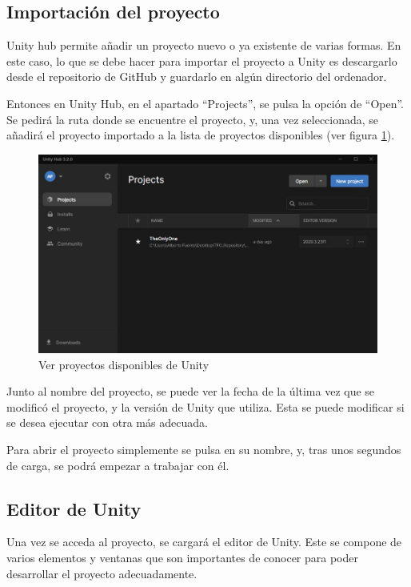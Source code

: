 \subsection{Importación del proyecto}
Unity hub permite añadir un proyecto nuevo o ya existente de varias formas. En este caso, lo que se debe hacer para importar el proyecto a Unity es descargarlo desde el repositorio de GitHub y guardarlo en algún directorio del ordenador.

Entonces en Unity Hub, en el apartado ``Projects'', se pulsa la opción de ``Open''. Se pedirá la ruta donde se encuentre el proyecto, y, una vez seleccionada, se añadirá el proyecto importado a la lista de proyectos disponibles (ver figura \ref{fig:ProyectosUnity}).

\begin{figure}[h]
    \centering
    \includegraphics[scale=0.45]{img/UnityProjects.jpg}
    \caption{Ver proyectos disponibles de Unity}
    \label{fig:ProyectosUnity}
    \end{figure}
    
Junto al nombre del proyecto, se puede ver la fecha de la última vez que se modificó el proyecto, y la versión de Unity que utiliza. Esta se puede modificar si se desea ejecutar con otra más adecuada.

Para abrir el proyecto simplemente se pulsa en su nombre, y, tras unos segundos de carga, se podrá empezar a trabajar con él.

\subsection{Editor de Unity}
Una vez se acceda al proyecto, se cargará el editor de Unity. Este se compone de varios elementos y ventanas que son importantes de conocer para poder desarrollar el proyecto adecuadamente.

